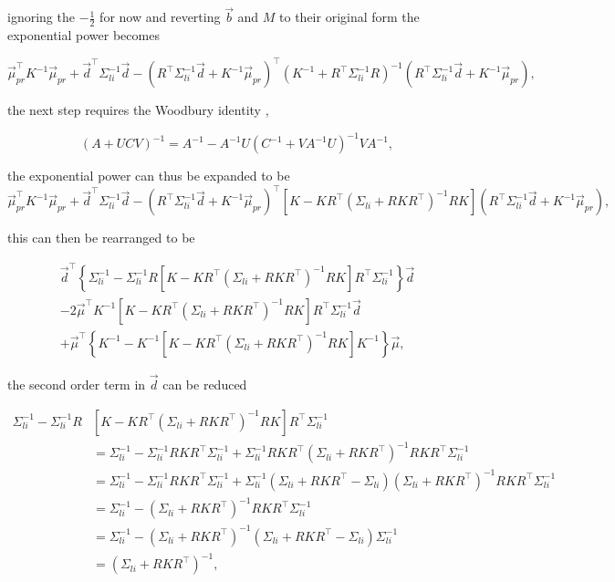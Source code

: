 \noindent ignoring the $-\frac{1}{2}$ for now and reverting $\vec b$ and $M$ to their original form the exponential power becomes

$$
\vec{\mu}_{pr}^{\top} K^{-1} \vec{\mu}_{pr} + \vec{d}^{\top} \Sigma_{li}^{-1} \vec{d}- (R^{\top} \Sigma_{li}^{-1} \vec{d} + K^{-1}\vec{\mu}_{pr})^{\top} (K^{-1} + R^{\top} \Sigma_{li}^{-1} R)^{-1} (R^{\top} \Sigma_{li}^{-1} \vec{d} + K^{-1}\vec{\mu}_{pr}),
$$

\noindent the next step requires the Woodbury identity \cite{gp4ml}, 

\begin{equation}
(A + UCV)^{-1} = A^{-1} - A^{-1}U(C^{-1}+VA^{-1}U)^{-1}VA^{-1},
\end{equation}

\noindent the exponential power can thus be expanded to be
$$
\vec{\mu}_{pr}^{\top} K^{-1} \vec{\mu}_{pr} + \vec{d}^{\top} \Sigma_{li}^{-1} \vec{d} - (R^{\top} \Sigma_{li}^{-1} \vec{d} + K^{-1}\vec{\mu}_{pr})^{\top} \left[K - K R^{\top} \left(\Sigma_{li} + RK R^{\top}\right)^{-1} R K \right] (R^{\top} \Sigma_{li}^{-1} \vec{d} + K^{-1}\vec{\mu}_{pr}),
$$

\noindent this can then be rearranged to be

\begin{multline*}
\vec{d}^{\top} \left\{ \Sigma_{li}^{-1} - \Sigma_{li}^{-1} R \left[K - K R^{\top} \left(\Sigma_{li} + RK R^{\top}\right)^{-1} R K \right] R^{\top} \Sigma_{li}^{-1} \right\} \vec{d} \\- 2 \vec{\mu}^{\top} K^{-1} \left[K - K R^{\top} \left(\Sigma_{li} + RK R^{\top}\right)^{-1} R K \right] R^{\top} \Sigma_{li}^{-1} \vec{d} \\+ \vec{\mu}^{\top} \left\{ K^{-1} - K^{-1}\left[K - K R^{\top} \left(\Sigma_{li} + RK R^{\top}\right)^{-1} R K \right] K^{-1} \right\}\vec{\mu},
\end{multline*}

\noindent the second order term in $\vec d$ can be reduced

$$
\begin{aligned}
\Sigma_{li}^{-1} - \Sigma_{li}^{-1} R &\left[K - K R^{\top} \left(\Sigma_{li} + RK R^{\top}\right)^{-1} R K \right] R^{\top} \Sigma_{li}^{-1} \\ &= \Sigma_{li}^{-1} - \Sigma_{li}^{-1} R K R^{\top} \Sigma_{li}^{-1} + \Sigma_{li}^{-1} R K R^{\top} \left(\Sigma_{li} + RK R^{\top}\right)^{-1} R K R^{\top} \Sigma_{li}^{-1}\\ &= \Sigma_{li}^{-1} - \Sigma_{li}^{-1} R K R^{\top} \Sigma_{li}^{-1} + \Sigma_{li}^{-1} \left(\Sigma_{li} + R K R^{\top} - \Sigma_{li}\right)\left(\Sigma_{li} + RK R^{\top}\right)^{-1} R K R^{\top} \Sigma_{li}^{-1} \\
&= \Sigma_{li}^{-1} - \left(\Sigma_{li} + RK R^{\top}\right)^{-1} R K R^{\top} \Sigma_{li}^{-1} \\ &= \Sigma_{li}^{-1} - \left(\Sigma_{li} + RK R^{\top}\right)^{-1} \left(\Sigma_{li} + R K R^{\top} - \Sigma_{li} \right)\Sigma_{li}^{-1} \\ &= \left(\Sigma_{li} + RK R^{\top}\right)^{-1},
\end{aligned}
$$

